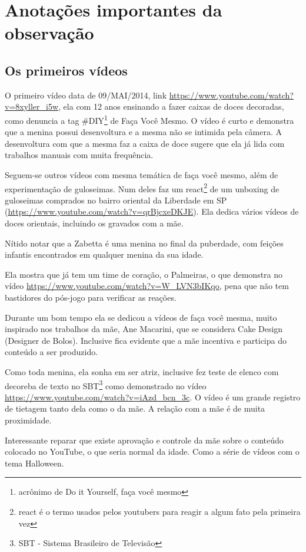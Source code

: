 \section{Anotações importantes da observação}

\subsection{Os primeiros vídeos}

O primeiro vídeo data de 09/MAI/2014, link \url{https://www.youtube.com/watch?v=8xyller_i5w}, ela com 12 anos ensinando a fazer caixas de doces decoradas, como denuncia a tag \#DIY\footnote{acrônimo de Do it Yourself, faça você mesmo} de Faça Você Mesmo. O vídeo é curto e demonstra que a menina possui desenvoltura e a mesma não se intimida pela câmera. A desenvoltura com que a mesma faz a caixa de doce sugere que ela já lida com trabalhos manuais com muita frequência.

Seguem-se outros vídeos com mesma temática de faça você mesmo, além de experimentação de guloseimas. Num deles faz um react\footnote{react é o termo usados pelos youtubers para reagir a algum fato pela primeira vez} de um unboxing de guloseimas comprados no bairro oriental da Liberdade em SP (\url{https://www.youtube.com/watch?v=qrBjcxeDKJE}). Ela dedica vários vídeos de doces orientais, incluindo os gravados com a mãe.

Nítido notar que a Zabetta é uma menina no final da puberdade, com feições infantis encontrados em qualquer menina da sua idade.

Ela mostra que já tem um time de coração, o Palmeiras, o que demonstra no vídeo \url{https://www.youtube.com/watch?v=W_LVN3bIKqo}, pena que não tem bastidores do pós-jogo para verificar as reações.

Durante um bom tempo ela se dedicou a vídeos de faça você mesma, muito inspirado nos trabalhos da mãe, Ane Macarini, que se considera Cake Design (Designer de Bolos). Inclusive fica evidente que a mãe incentiva e participa do conteúdo a ser produzido.

Como toda menina, ela sonha em ser atriz, inclusive fez teste de elenco com decoreba de texto no SBT\footnote{SBT - Sistema Brasileiro de Televisão} como demonstrado no vídeo \url{https://www.youtube.com/watch?v=iAzd_bcn_3c}. O vídeo é um grande registro de tietagem tanto dela como o da mãe. A relação com a mãe é de muita proximidade.

Interessante reparar que existe aprovação e controle da mãe sobre o conteúdo colocado no YouTube, o que seria normal da idade. Como a série de vídeos com o tema Halloween.

